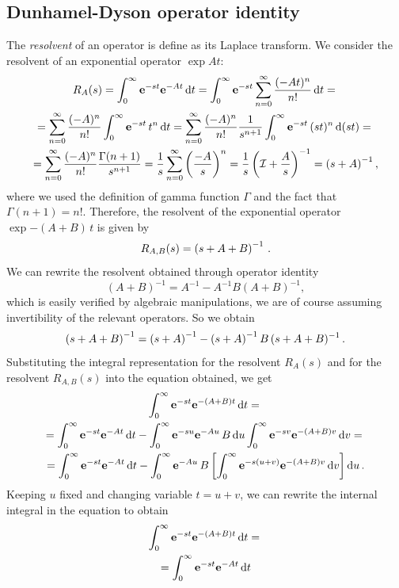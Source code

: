 \documentclass[10pt,a4paper]{book}
\theoremstyle{definition}
\begin{document}
\begin{appendices}
\chapter{Dunhamel-Dyson operator identity}
\label{App:D}
The \emph{resolvent} of an operator is define as its Laplace transform. We consider the resolvent of an exponential operator $\exp{At}$:
\begin{multline*}
R_A(s) = \int_0^{\infty} \mathbf{e}^{-st}\mathbf{e}^{-At}\,\mbox{d} t = \int_0^{\infty} \mathbf{e}^{-st}\sum_{n=0}^{\infty}\frac{(-At)^n}{n!} \,\mbox{d} t ={}\\
   = \sum_{n=0}^{\infty}\frac{(-A)^n}{n!}\int_0^{\infty} \mathbf{e}^{-st}\, t^n\, \mbox{d} t =
     \sum_{n=0}^{\infty}\frac{(-A)^n}{n!}\frac{1}{s^{n+1}}\int_0^{\infty} \mathbf{e}^{-st}\, (st)^n\, \mbox{d} (st) ={}\\
   = \sum_{n=0}^{\infty}\frac{(-A)^n}{n!}\frac{\Gamma(n+1)}{s^{n+1}} =
     \frac{1}{s}\sum_{n=0}^{\infty}\left(\frac{-A}{s}\right)^n = \frac{1}{s}\left(\mathcal{I}+\frac{A}{s}\right)^{-1} = \left(s+A\right)^{-1}, 
\end{multline*}
where we used the definition of gamma function $\Gamma$ and the fact that $\Gamma(n+1)=n!$. 
Therefore, the resolvent of the exponential operator $\exp{-(A+B)\,t}$ is given by 
$$ 
 R_{A,B}(s)=\left(s+A+B\right)^{-1}\,.
$$ 
We can rewrite the resolvent obtained through operator identity 
$$
(A+B)^{-1}=A^{-1}-A^{-1}B(A+B)^{-1},
$$
which is easily verified by algebraic manipulations, we are of course assuming invertibility of the relevant operators. So we obtain
$$
 \left(s+A+B\right)^{-1}=\left(s+A\right)^{-1} - \left(s+A\right)^{-1} B\, (s+A+B)^{-1}\,.
$$ 
Substituting the integral representation for the resolvent $R_A(s)$ and for the resolvent $R_{A,B}(s)$ into the equation obtained, we get
\begin{multline*}
 \int_0^{\infty} \mathbf{e}^{-st}\mathbf{e}^{-(A+B)t}\,\mbox{d} t ={}\\ 
    = \int_0^{\infty} \mathbf{e}^{-st}\mathbf{e}^{-At}\,\mbox{d} t -
      \int_0^{\infty} \mathbf{e}^{-su}\mathbf{e}^{-Au}\,B\,\mbox{d} u \int_0^{\infty} \mathbf{e}^{-sv}\mathbf{e}^{-(A+B)v}\,\mbox{d} v ={}\\ 
    = \int_0^{\infty} \mathbf{e}^{-st}\mathbf{e}^{-At}\,\mbox{d} t - 
      \int_0^{\infty}\mathbf{e}^{-Au}\,B \left[ \int_0^{\infty} \mathbf{e}^{-s(u+v)}\mathbf{e}^{-(A+B)v}\,\mbox{d} v \right] \mbox{d} u\,.
\end{multline*} 
Keeping $u$ fixed and changing variable $t=u+v$, we can rewrite the internal integral in the equation to obtain
\begin{multline*}
 \int_0^{\infty} \exp{-st}\exp{-(A+B)t}\,\diff t ={}\\ 
  = \int_0^{\infty} \exp{-st}\exp{-At}\,\diff t 

\end{multline*}
\end{appendices}
\end{document}
